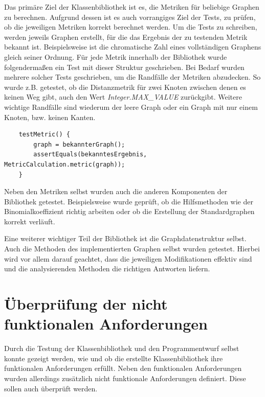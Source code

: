 \documentclass[a4paper,12pt,ngerman,chapterprefix=false,listof=totoc,bibliography=totoc]{scrreprt}
\begin{document}
{{{Das primäre Ziel der Klassenbibliothek ist es, die Metriken für beliebige Graphen zu berechnen. Aufgrund dessen ist es auch vorrangiges Ziel der Tests, zu prüfen, ob die jeweiligen Metriken korrekt berechnet werden. Um die Tests zu schreiben, werden jeweils Graphen erstellt, für die das Ergebnis der zu testenden Metrik bekannt ist. Beispielsweise ist die chromatische Zahl eines vollständigen Graphens gleich seiner Ordnung. Für jede Metrik innerhalb der Bibliothek wurde folgendermaßen ein Test mit dieser Struktur geschrieben. Bei Bedarf wurden mehrere solcher Tests geschrieben, um die Randfälle der Metriken abzudecken. So wurde z.B. getestet, ob die Distanzmetrik für zwei Knoten zwischen denen es keinen Weg gibt, auch den Wert \textit{Integer.MAX\_VALUE} zurückgibt. Weitere wichtige Randfälle sind wiederum der leere Graph oder ein Graph mit nur einem Knoten, bzw. keinen Kanten.
\begin{lstlisting}
	testMetric() {
		graph = bekannterGraph();
		assertEquals(bekanntesErgebnis, MetricCalculation.metric(graph));
	}
\end{lstlisting}
Neben den Metriken selbst wurden auch die anderen Komponenten der Bibliothek getestet. Beispielsweise wurde geprüft, ob die Hilfsmethoden wie der Binomialkoeffizient richtig arbeiten oder ob die Erstellung der Standardgraphen korrekt verläuft.

Eine weiterer wichtiger Teil der Bibliothek ist die Graphdatenstruktur selbst. Auch die Methoden des implementierten Graphen selbst wurden getestet. Hierbei wird vor allem darauf geachtet, dass die jeweiligen Modifikationen effektiv sind und die analysierenden Methoden die richtigen Antworten liefern.
}
\section{Überprüfung der nicht funktionalen Anforderungen}
{
Durch die Testung der Klassenbibliothek und den Programmentwurf selbst konnte gezeigt werden, wie und ob die erstellte Klassenbibliothek ihre funktionalen Anforderungen erfüllt. Neben den funktionalen Anforderungen wurden allerdings zusätzlich nicht funktionale Anforderungen definiert. Diese sollen auch überprüft werden.

}}}
\end{document}
